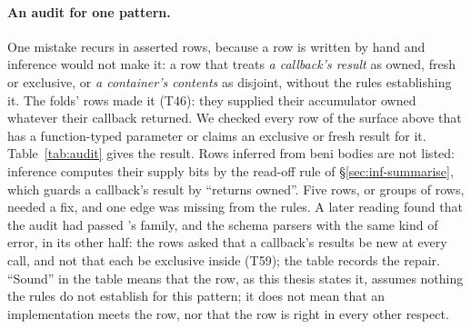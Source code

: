 \paragraph{An audit for one pattern.} One mistake recurs in asserted rows, because a row is written by
hand and inference would not make it: a row that treats \emph{a callback's result} as owned, fresh or
exclusive, or \emph{a container's contents} as disjoint, without the rules establishing it. The folds'
rows made it (T46): they supplied their accumulator owned whatever their callback returned. We checked
every row of the surface above that has a function-typed parameter or claims an exclusive or fresh result
for it. Table~\ref{tab:audit} gives the result. Rows inferred from beni bodies are not listed: inference
computes their supply bits by the read-off rule of \S\ref{sec:inf-summarise}, which guards a callback's
result by ``returns owned''. Five rows, or groups of rows, needed a fix, and one edge was missing from the rules.
A later reading found that the audit had passed 's family,  and the schema
parsers with the same kind of error, in its other half: the rows asked that a callback's results be new at
every call, and not that each be exclusive inside (T59); the table records the repair. ``Sound'' in the
table means that the row, as this thesis states it, assumes nothing the rules do not establish for this
pattern; it does not mean that an implementation meets the row, nor that the row is right in every other
respect.

